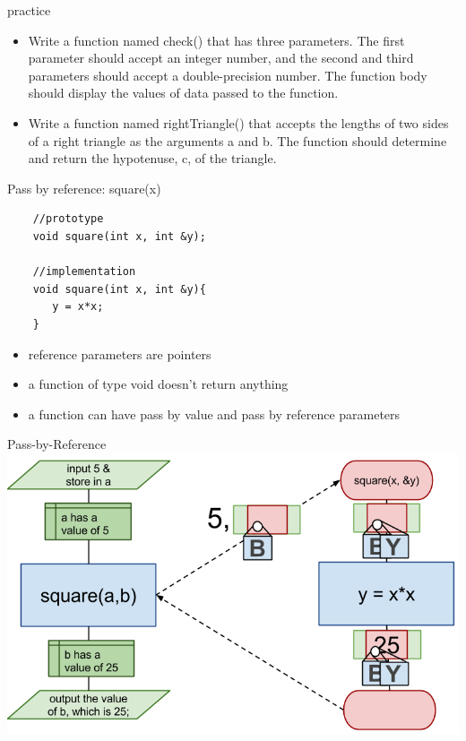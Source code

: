 \documentclass[xcolor={dvipsnames}]{beamer}
\begin{document}
\begin{frame}{practice}
	\begin{itemize}
		\item Write a function named check() that has three parameters. The first parameter should accept an integer number, and the second and third parameters should accept a double-precision number. The function body should display the values of
data passed to the function.
		\item Write a function named rightTriangle() that accepts the lengths of two sides of a right triangle as the arguments a and b. The function should determine and return the hypotenuse, c, of the triangle.
	\end{itemize}
\end{frame}

\begin{frame}[fragile]{Pass by reference: square(x)}
	\begin{center} 
	\begin{verbatim}
	//prototype
	void square(int x, int &y);

	//implementation
	void square(int x, int &y){
	   y = x*x;
	}   
	\end{verbatim}
	\end{center}
	\begin{center}
		\begin{itemize}
			\item reference parameters are pointers
			\item a function of type void doesn't return anything
			\item a function can have pass by value and pass by reference parameters
		\end{itemize}
	\end{center}
\end{frame}

\begin{frame}{Pass-by-Reference}
\includegraphics[width=1\textwidth]{fsq_pbr}
\end{frame}
\end{document}
